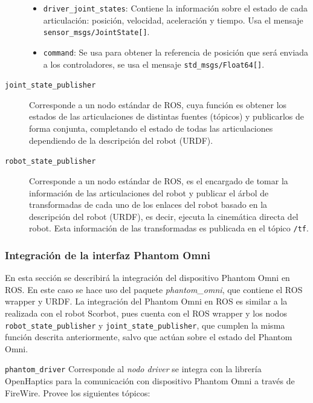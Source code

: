\begin{description}
\begin{itemize}
\item \texttt{driver\_joint\_states}: Contiene la información sobre el estado de cada articulación: posición, velocidad, aceleración y tiempo. Usa el mensaje  \texttt{sensor\_msgs/JointState[]}.

\item  \texttt{command}: Se usa para obtener la referencia de posición que será enviada a los controladores, se usa el mensaje \texttt{std\_msgs/Float64[]}.
 
\end{itemize}



\item[\texttt{joint\_state\_publisher}] Corresponde a un nodo estándar de ROS, cuya función es obtener los estados de las articulaciones de distintas fuentes (tópicos) y publicarlos de forma conjunta, completando el estado de todas las articulaciones dependiendo de la descripción del robot (URDF).

\item[\texttt{robot\_state\_publisher}] Corresponde a un nodo estándar de ROS, es el encargado de tomar la información de las articulaciones del robot y publicar el árbol de transformadas de cada uno de los enlaces del robot basado en la descripción del robot (URDF), es decir, ejecuta la cinemática directa del robot. Esta información de las transformadas es publicada en el tópico \texttt{/tf}.

\end{description}


\subsubsection{Integración de la interfaz Phantom Omni}

En esta sección se describirá la integración del dispositivo Phantom Omni en ROS. En este caso se hace uso del paquete \textit{phantom\_omni}\cite{phantom_git}, que contiene el ROS wrapper y URDF. La integración del Phantom Omni en ROS es similar a la realizada con el robot Scorbot, pues cuenta con el  ROS wrapper y los nodos \texttt{robot\_state\_publisher} y  \texttt{joint\_state\_publisher}, que cumplen la misma función descrita anteriormente, salvo que actúan sobre el estado del Phantom Omni.

\texttt{phantom\_driver} Corresponde al \textit{nodo driver} se integra con la librería OpenHaptics para la comunicación con dispositivo Phantom Omni a través de FireWire. Provee los siguientes tópicos:

